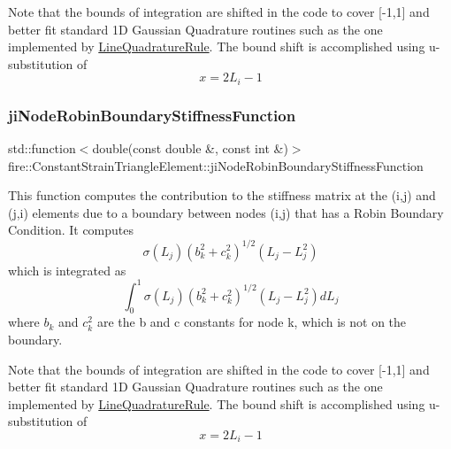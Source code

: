 Note that the bounds of integration are shifted in the code to cover \mbox{[}-\/1,1\mbox{]} and better fit standard 1D Gaussian Quadrature routines such as the one implemented by \hyperlink{a00885}{Line\+Quadrature\+Rule}. The bound shift is accomplished using u-\/substitution of \[ x = 2L_{i} - 1 \] \mbox{\label{a00789_a6fb845d019aa63800d467329265b4a60}} 
\subsubsection{\texorpdfstring{ji\+Node\+Robin\+Boundary\+Stiffness\+Function}{jiNodeRobinBoundaryStiffnessFunction}}
{\footnotesize\ttfamily std\+::function$<$double(const double \&, const int \&)$>$ fire\+::\+Constant\+Strain\+Triangle\+Element\+::ji\+Node\+Robin\+Boundary\+Stiffness\+Function\hspace{0.3cm}{\ttfamily [protected]}}

This function computes the contribution to the stiffness matrix at the (i,j) and (j,i) elements due to a boundary between nodes (i,j) that has a Robin Boundary Condition. It computes \[ \sigma(L_{j})(b_{k}^2 + c_{k}^2)^{1/2}(L_{j}-L_{j}^{2}) \] which is integrated as \[ \int_{0}^{1} \sigma(L_{j})(b_{k}^2 + c_{k}^2)^{1/2}(L_{j}-L_{j}^{2}) dL_{j} \] where $b_{k}$ and $c_{k}^2$ are the b and c constants for node k, which is not on the boundary.

Note that the bounds of integration are shifted in the code to cover \mbox{[}-\/1,1\mbox{]} and better fit standard 1D Gaussian Quadrature routines such as the one implemented by \hyperlink{a00885}{Line\+Quadrature\+Rule}. The bound shift is accomplished using u-\/substitution of \[ x = 2L_{i} - 1 \] \mbox{\label{a00789_a9fcfa817ef9b82d560608bcc531e41e5}} 
